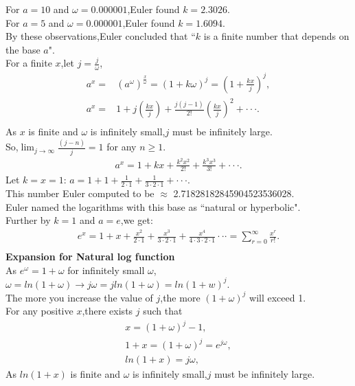 \documentclass[a4paper,reqno,11pt]{book}
\theoremstyle{plain}%
\theoremstyle{definition}
\begin{document}
\noindent For $a=10$ and $\omega=0.000001$,Euler found $k=2.3026$.\\
For $a=5$ and $\omega=0.000001$,Euler found $k=1.6094$.\\
By these observations,Euler concluded that ``$k$ is a finite number that depends on the base $a$".\\
For a finite $x$,let $j=\frac{j}{\omega}$,
\begin{align*}
a^x=&(a^\omega)^\frac{x}{\omega}=(1+k\omega)^j=\left(1+\frac{kx}{j}\right)^j,\\
a^x=&1+j\left(\frac{kx}{j}\right)+\frac{j(j-1)}{2!}\left(\frac{kx}{j}\right)^2+\cdot\cdot\cdot.\\
\end{align*}
As $x$ is finite and $\omega$ is infinitely small,$j$ must be infinitely large.\\
So,$\lim_{j\to\infty}\frac{(j-n)}{j}=1$ for any $n\geq1$.
\begin{eqnarray*}
a^x=1+kx+\frac{k^2x^2}{2!}+\frac{k^3x^3}{3!}+\cdot\cdot\cdot.
\end{eqnarray*}
Let $k=x=1$:
$a=1+1+\frac{1}{2\cdot1}+\frac{1}{3\cdot2\cdot1}+\cdot\cdot\cdot$.\\
This number Euler computed to be $\approx$ 2.71828182845904523536028.\\
Euler named the logarithms with this base as ``natural or hyperbolic".\\
Further by $k=1$ and $a=e$,we get:
\begin{eqnarray*}
e^x=1+x+\frac{x^2}{2\cdot1}+\frac{x^3}{3\cdot2\cdot1}+\frac{x^4}{4\cdot3\cdot2\cdot1}\cdot\cdot\cdot=\sum_{r=0}^{\infty}\frac{x^r}{r!}.\\
\end{eqnarray*}
\noindent\textbf{Expansion for Natural log function}\\
As $e^\omega=1+\omega$ for infinitely small $\omega$,\\
$\omega=ln(1+\omega)$$\longrightarrow$$j\omega=jln(1+\omega)=ln(1+w)^j$.\\
The more you increase the value of $j$,the more $(1+\omega)^j$ will exceed 1.\\
For any positive $x$,there exists $j$ such that
\begin{eqnarray*}
    x=(1+\omega)^j-1,\\
    1+x=(1+\omega)^j=e^{j\omega},\\
    ln(1+x)=j\omega,
\end{eqnarray*}
As $ln(1+x)$ is finite and $\omega$ is infinitely small,$j$ must be infinitely large.\\
\end{document}
